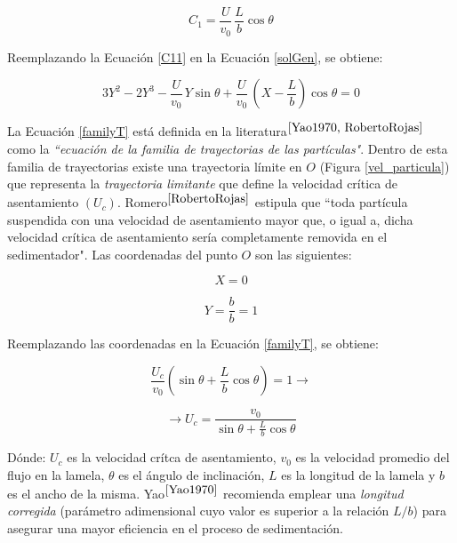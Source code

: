 \begin{equation}
	C_1 = \frac{U}{v_0} \, \frac{L}{b} \cos \theta
	\label{C11}
\end{equation}

\noindent
\justify

Reemplazando la Ecuaci\'on \ref{C11} en la Ecuaci\'on \ref{solGen}, se obtiene:

\begin{equation}
	\boxed{3 Y ^2 - 2 Y ^3 - \frac{U}{v_0} \, Y \sin \theta + \frac{U}{v_0} \, \left(X- \frac{L}{b} \right) \cos \theta = 0}
	\label{familyT}
\end{equation}

\noindent
\justify

La Ecuaci\'on \ref{familyT} est\'a definida en la literatura$^{\cite{Yao1970, RobertoRojas}}$ como la \textit{``ecuaci\'on de la familia de trayectorias de las part\'iculas"}. Dentro de esta familia de trayectorias existe una trayectoria l\'imite en $O$ (Figura \ref{vel_particula}) que representa la \textit{trayectoria limitante} que define la velocidad cr\'itica de asentamiento $\left( U_ {c} \right)$. Romero$^{\cite{RobertoRojas}}$ estipula que ``toda part\'icula suspendida con una velocidad de asentamiento mayor que, o igual a, dicha velocidad cr\'itica de asentamiento ser\'ia completamente removida en el sedimentador". Las coordenadas del punto $O$ son las siguientes:

\begin{equation*}
	X = 0
\end{equation*}

\begin{equation*}
	Y = \frac{b}{b} = 1
\end{equation*}

\noindent
\justify

Reemplazando las coordenadas en la Ecuaci\'on \ref{familyT}, se obtiene:

\begin{equation*}
	\frac{U_{c}}{v_0} \left(\sin \theta + \frac{L}{b} \cos \theta \right) = 1 \rightarrow
\end{equation*}

\begin{equation}
	\rightarrow U_c = \frac{v_0}{\sin \theta + \frac{L}{b} \cos \theta}
	\label{Uc}
\end{equation}

\noindent
\justify

D\'onde: $U_c$ es la velocidad cr\'itca de asentamiento, $v_0$ es la velocidad promedio del flujo en la lamela, $\theta$ es el \'angulo de inclinaci\'on, $L$ es la longitud de la lamela y $b$ es el ancho de la misma. Yao$^{\cite{Yao1970}}$ recomienda emplear una \textit{longitud corregida} (par\'ametro adimensional cuyo valor es superior a la relaci\'on $L/b$) para asegurar una mayor eficiencia en el proceso de sedimentaci\'on.  


